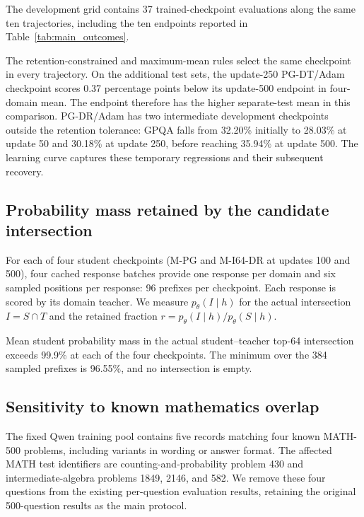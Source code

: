 The development grid contains 37 trained-checkpoint evaluations along the same ten trajectories, including the ten endpoints reported in Table~\ref{tab:main_outcomes}.

The retention-constrained and maximum-mean rules select the same checkpoint in every trajectory. On the additional test sets, the update-250 PG-DT/Adam checkpoint scores 0.37 percentage points below its update-500 endpoint in four-domain mean. The endpoint therefore has the higher separate-test mean in this comparison. PG-DR/Adam has two intermediate development checkpoints outside the retention tolerance: GPQA falls from 32.20\% initially to 28.03\% at update 50 and 30.18\% at update 250, before reaching 35.94\% at update 500. The learning curve captures these temporary regressions and their subsequent recovery.

\subsection{Probability mass retained by the candidate intersection}
\label{app:actual_intersection_coverage}

For each of four student checkpoints (M-PG and M-I64-DR at updates 100 and 500), four cached response batches provide one response per domain and six sampled positions per response: 96 prefixes per checkpoint. Each response is scored by its domain teacher. We measure $p_\theta(I\mid h)$ for the actual intersection $I=S\cap T$ and the retained fraction $r=p_\theta(I\mid h)/p_\theta(S\mid h)$.

Mean student probability mass in the actual student--teacher top-64 intersection exceeds 99.9\% at each of the four checkpoints. The minimum over the 384 sampled prefixes is 96.55\%, and no intersection is empty.

\subsection{Sensitivity to known mathematics overlap}
\label{app:math_overlap_sensitivity}

The fixed Qwen training pool contains five records matching four known MATH-500 problems, including variants in wording or answer format. The affected MATH test identifiers are counting-and-probability problem 430 and intermediate-algebra problems 1849, 2146, and 582. We remove these four questions from the existing per-question evaluation results, retaining the original 500-question results as the main protocol.

